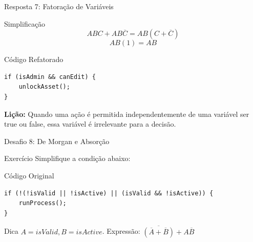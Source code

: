 \documentclass[9pt]{beamer}
\begin{document}
\begin{frame}[fragile]{Resposta 7: Fatoração de Variáveis}

\begin{alertblock}{Simplificação}
\[ ABC + AB\overline{C} = AB(C + \overline{C}) \]
\[ AB(1) = AB \]
\end{alertblock}

\begin{block}{Código Refatorado}
\begin{verbatim}
if (isAdmin && canEdit) {
    unlockAsset();
}
\end{verbatim}
\end{block}

\vspace{0.4cm}
\textcolor{structure}{\footnotesize \textbf{Lição:} Quando uma ação é permitida independentemente de uma variável ser true ou false, essa variável é irrelevante para a decisão.}

\end{frame}

\begin{frame}[fragile]{Desafio 8: De Morgan e Absorção}

\begin{block}{Exercício}
Simplifique a condição abaixo:
\end{block}

\begin{alertblock}{Código Original}
\begin{verbatim}
if (!(!isValid || !isActive) || (isValid && !isActive)) {
    runProcess();
}
\end{verbatim}
\end{alertblock}

\begin{block}{Dica}
$A = isValid, B = isActive$.
Expressão: $\overline{(\overline{A} + \overline{B})} + A\overline{B}$
\end{block}

\end{frame}
\end{document}
